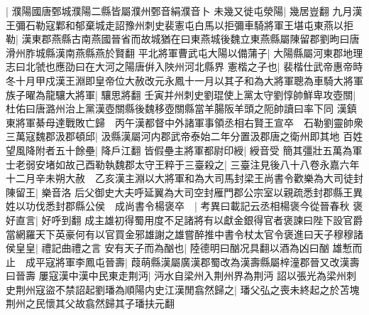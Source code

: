 |{
	濮陽國唐鄄城濮陽二縣皆屬濮州鄄音絹濮音卜}
未幾又徙屯滎陽|{
	幾居豈翻}
九月漢王彌石勒寇鄴和郁棄城走詔豫州刺史裴憲屯白馬以拒彌車騎將軍王堪屯東燕以拒勒|{
	漢東郡燕縣古南燕國晉省而故城猶在曰東燕城後魏立東燕縣屬陳留郡劉昫曰唐滑州胙城縣漢南燕縣燕於賢翻}
平北將軍曹武屯大陽以備蒲子|{
	大陽縣屬河東郡地理志曰北虢也應劭曰在大河之陽唐倂入陜州河北縣界}
憲楷之子也|{
	裴楷仕武帝惠帝時}
冬十月甲戍漢王淵即皇帝位大赦改元永鳳十一月以其子和為大將軍聰為車騎大將軍族子曜為龍驤大將軍|{
	驤思將翻}
壬寅并州刺史劉琨使上黨太守劉惇帥鮮卑攻壺關|{
	杜佑曰唐潞州治上黨漢壺關縣後魏移壺關縣當羊腸阪羊頭之阨帥讀曰率下同}
漢鎮東將軍綦母達戰敗亡歸　丙午漢都督中外諸軍事領丞相右賢王宣卒　石勒劉靈帥衆三萬寇魏郡汲郡頓邱|{
	汲縣漢屬河内郡武帝泰始二年分置汲郡唐之衛州即其地}
百姓望風降附者五十餘壘|{
	降戶江翻}
皆假壘主將軍都尉印綬|{
	綬音受}
簡其彊壯五萬為軍士老弱安堵如故己酉勒執魏郡太守王粹于三臺殺之|{
	三臺注見後八十八卷永嘉六年}
十二月辛未朔大赦　乙亥漢主淵以大將軍和為大司馬封梁王尚書令歡樂為大司徒封陳留王|{
	樂音洛}
后父御史大夫呼延翼為大司空封雁門郡公宗室以親疏悉封郡縣王異姓以功伐悉封郡縣公侯　成尚書令楊褒卒　|{
	考異曰載記云丞相楊褒今從晉春秋}
褒好直言|{
	好呼到翻}
成主雄初得蜀用度不足諸將有以獻金銀得官者褒諫曰陛下設官爵當網羅天下英豪何有以官買金邪雄謝之雄嘗醉推中書令杖太官令褒進曰天子穆穆諸侯皇皇|{
	禮記曲禮之言}
安有天子而為酗也|{
	陸德明曰酗况具翻以酒為凶曰酗}
雄慙而止　成平寇將軍李鳳屯晉壽|{
	葭萌縣漢屬廣漢郡蜀改為漢壽縣屬梓潼郡晉又改漢壽曰晉壽}
屢寇漢中漢中民東走荆沔|{
	沔水自梁州入荆州界為荆沔}
詔以張光為梁州刺史荆州寇盜不禁詔起劉璠為順陽内史江漢閒翕然歸之|{
	璠父弘之喪未終起之於苫塊荆州之民懷其父故翕然歸其子璠扶元翻}


